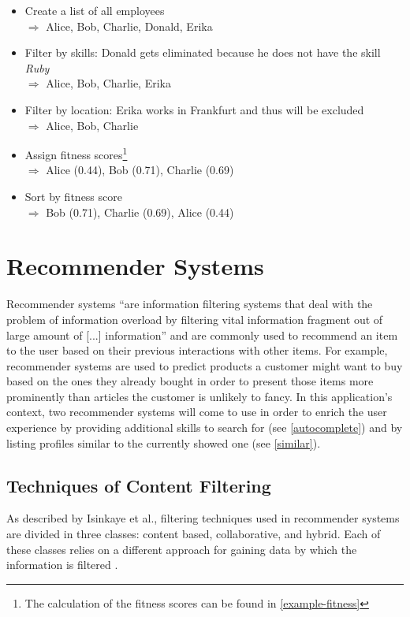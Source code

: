 \begin{itemize}
  \item Create a list of all employees\\
    $\Rightarrow$ Alice, Bob, Charlie, Donald, Erika
  \item Filter by skills: Donald gets eliminated because he does not have the skill \textit{Ruby}\\
    $\Rightarrow$ Alice, Bob, Charlie, Erika
  \item Filter by location: Erika works in Frankfurt and thus will be excluded\\
    $\Rightarrow$ Alice, Bob, Charlie
  \item Assign fitness scores\footnote{The calculation of the fitness scores can be found in \ref{example-fitness}}\\
    $\Rightarrow$ Alice (0.44), Bob (0.71), Charlie (0.69)
  \item Sort by fitness score\\
    $\Rightarrow$ Bob (0.71), Charlie (0.69), Alice (0.44)
\end{itemize}


\section{Recommender Systems}
Recommender systems ``are information filtering systems that deal with the problem of information overload by filtering vital information fragment out of large amount of [...] information'' \cite{Isinkaye2015261}\label{recommender-definition} and are commonly used to recommend an item to the user based on their previous interactions with other items. For example, recommender systems are used to predict products a customer might want to buy based on the ones they already bought in order to present those items more prominently than articles the customer is unlikely to fancy. In this application's context, two recommender systems will come to use in order to enrich the user experience by providing additional skills to search for (see \ref{autocomplete}) and by listing profiles similar to the currently showed one (see \ref{similar}).

\subsection{Techniques of Content Filtering}
As described by Isinkaye et al., filtering techniques used in recommender systems are divided in three classes: content based, collaborative, and hybrid. Each of these classes relies on a different approach for gaining data by which the information is filtered \cite{Isinkaye2015261}.

